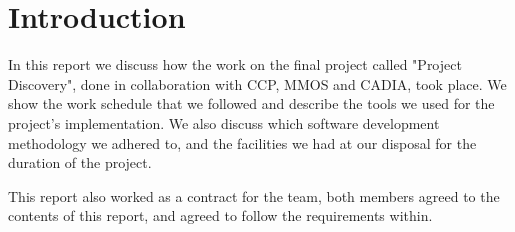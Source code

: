 \section{Introduction}\label{sec:introduction}
In this report we discuss how the work on the final project called "Project Discovery", done in collaboration with CCP, MMOS and CADIA, took place. We show the work schedule that we followed and describe the tools we used for the project's implementation. We also discuss which software development methodology we adhered to, and the facilities we had at our disposal for the duration of the project. 

This report also worked as a contract for the team, both members agreed to the contents of this report, and agreed to follow the requirements within.